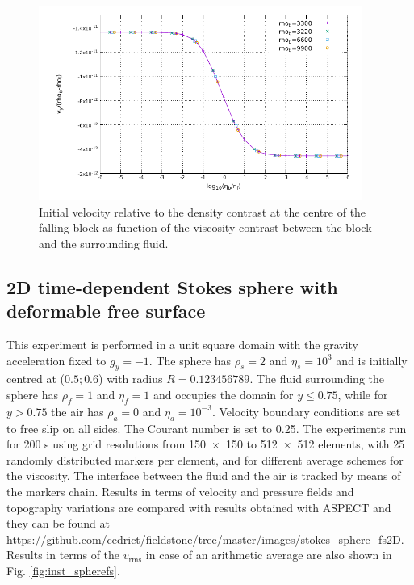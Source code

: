 \documentclass[hidelinks,10pt,a4paper]{article}
\begin{document}
\begin{figure}
\centering
\noindent\includegraphics[width=400px]{./Figures/Falling.pdf}
\caption{Initial velocity relative to the density contrast at the centre of the falling block as function of the viscosity contrast between the block and the
surrounding fluid.}
\label{fig:falling}
\end{figure}

\subsection{2D time-dependent Stokes sphere with deformable free surface}\label{sec:sphere}
This experiment is performed in a unit square domain with the gravity acceleration fixed to $g_y=-1$. The sphere has $\rho_s=2$ and $\eta_s=10^3$ and is
initially centred at ($0.5;0.6$) with radius $R=0.123456789$. The fluid surrounding the sphere has $\rho_f=1$ and $\eta_f=1$ and occupies the domain for
$y\leq 0.75$, while for $y>0.75$ the air has $\rho_a=0$ and $\eta_a=10^{-3}$. Velocity boundary conditions are set to free slip on all sides. The Courant
number is set to 0.25. The experiments run for 200 s using grid resolutions from \num{150x150} to \num{512x512} elements, with 25 randomly distributed markers
per element, and for different average schemes for the viscosity. The interface between the fluid and the air is tracked by means of the markers chain. Results
in terms of velocity and pressure fields and topography variations are compared with results obtained with ASPECT
\citep{KHB12,heister_aspect_methods2,aspect-doi-v2.2.0,aspectmanual} and they can be found at
\url{https://github.com/cedrict/fieldstone/tree/master/images/stokes_sphere_fs2D}. Results in terms of the $v_{\textrm{rms}}$ in case of an arithmetic average are also
shown in Fig. \ref{fig:inst_spherefs}.
\end{document}
